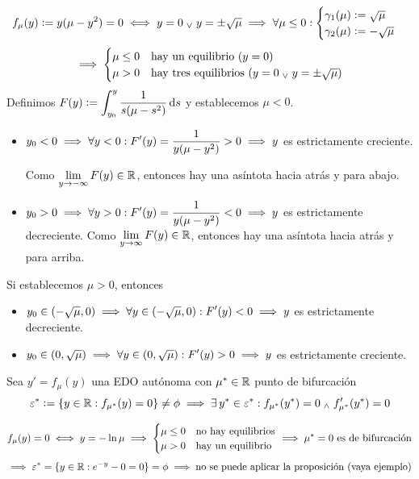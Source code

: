 \begin{ejem}[$\{y'=y(\mu - y^2) \we y(x_0)=y_0\}$]
	\[f_\mu (y) \vcentcolon= y(\mu - y^2) = 0 \iff y=0 \; _{\vee} \; y=\pm\sqrt{\mu} \implies \forall \mu \leq 0 : \begin{cases}
			\gamma_1 (\mu) \vcentcolon= \sqrt{\mu} \\
			\gamma_2 (\mu) \vcentcolon= -\sqrt{\mu}
		\end{cases}\]
	\[\implies \begin{cases}
			\mu \leq 0 & \text{hay un equilibrio } (y = 0)                          \\
			\mu > 0    & \text{hay tres equilibrios } (y = 0 \; _{\vee} \; y = \pm\sqrt{\mu})
		\end{cases}\]
	Definimos $\ds F(y) \defeq \int_{y_0}^{y} \frac{1}{s(\mu - s^2)}\odif{s}$ y establecemos $\mu < 0$.
	\begin{itemize}
		\item $\displaystyle y_0< 0 \implies \forall y < 0 : F'(y)=\frac{1}{y(\mu - y^2)} >0 \implies y$ es estrictamente creciente.

		      Como $\displaystyle \lim_{y\to-\infty} F(y) \in \mathbb{R}$, entonces hay una asíntota hacia atrás y para abajo.
		\item $\displaystyle y_0 > 0 \implies \forall y > 0 : F'(y) = \frac{1}{y(\mu - y^2)} < 0 \implies y$ es estrictamente decreciente.
		      Como $\displaystyle \lim_{y\to \infty} F(y) \in \mathbb{R}$, entonces hay una asíntota hacia atrás y para arriba.
	\end{itemize}
	Si establecemos $\mu > 0$, entonces
	\begin{itemize}
		\item $\displaystyle y_0 \in (-\sqrt{\mu}, 0) \implies \forall y \in (-\sqrt{\mu}, 0) : F'(y) < 0 \implies y$ es estrictamente decreciente.
		\item $\displaystyle y_0 \in (0, \sqrt{\mu}) \implies \forall y \in (0, \sqrt{\mu}) : F'(y) > 0 \implies y$ es estrictamente creciente.
	\end{itemize}
\end{ejem}
\begin{prop}
	Sea $y'=f_\mu(y)$ una EDO autónoma con $\mu^* \in \mathbb{R}$ punto de bifurcación
	\[\varepsilon^*\vcentcolon=\{y\in \mathbb{R} : f_{\mu^*} (y) = 0\} \ne \phi \implies \exists \, y^*\in \varepsilon^* : f_{\mu^*}(y^*)=0 \; _{\wedge} \; f_{\mu^*}'(y^*) = 0\]
\end{prop}
\begin{ejem}[$y'=e^{-y} - \mu = f_\mu(y)$]
	\[f_\mu(y) = 0 \iff y = -\ln{\mu} \implies \begin{cases}
			\mu \leq 0 & \text{no hay equilibrios} \\
			\mu > 0    & \text{hay un equilibrio}
		\end{cases} \implies \mu^*=0 \text{ es de bifurcación}\]
	\[\implies \varepsilon^* = \{y\in \mathbb{R} : e^{-y}-0 = 0\} = \phi \implies \text{no se puede aplicar la proposición (vaya ejemplo)}\]
\end{ejem}